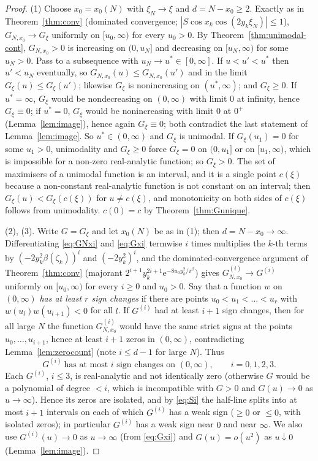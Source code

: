 \documentclass[11pt,a4paper]{article}
\theoremstyle{definition}
\theoremstyle{remark}
\newcommand{\ee}{\mathrm{e}}
\begin{document}
\begin{proof}
(1) Choose $x_0=x_0(N)$ with $\xi_N\to\xi$ and $d=N-x_0\ge2$. Exactly as in Theorem~\ref{thm:conv} (dominated
convergence; $|S\cos x_k\cos(2y_k\xi_N)|\le1$), $G_{N,x_0}\to G_\xi$ uniformly on $[u_0,\infty)$ for every $u_0>0$.
By Theorem~\ref{thm:unimodal-cont}, $G_{N,x_0}>0$ is increasing on $(0,u_N]$ and decreasing on $[u_N,\infty)$ for
some $u_N>0$. Pass to a subsequence with $u_N\to u^*\in[0,\infty]$. If $u<u'<u^*$ then $u'<u_N$ eventually, so
$G_{N,x_0}(u)\le G_{N,x_0}(u')$ and in the limit $G_\xi(u)\le G_\xi(u')$; likewise $G_\xi$ is nonincreasing on
$(u^*,\infty)$; and $G_\xi\ge0$. If $u^*=\infty$, $G_\xi$ would be nondecreasing on $(0,\infty)$ with limit $0$ at
infinity, hence $G_\xi\equiv0$; if $u^*=0$, $G_\xi$ would be nonincreasing with limit $0$ at $0^+$
(Lemma~\ref{lem:image}), hence again $G_\xi\equiv0$; both contradict the last statement of
Lemma~\ref{lem:image}. So $u^*\in(0,\infty)$ and $G_\xi$ is unimodal.
If $G_\xi(u_1)=0$ for some $u_1>0$, unimodality and $G_\xi\ge0$ force $G_\xi=0$ on $(0,u_1]$ or on $[u_1,\infty)$,
which is impossible for a non-zero real-analytic function; so $G_\xi>0$. The set of maximisers of a unimodal
function is an interval, and it is a single point $c(\xi)$ because a non-constant real-analytic function is not
constant on an interval; then $G_\xi(u)<G_\xi(c(\xi))$ for $u\ne c(\xi)$, and monotonicity on both sides of
$c(\xi)$ follows from unimodality. $c(0)=c$ by Theorem~\ref{thm:Gunique}.

(2), (3). Write $G=G_\xi$ and let $x_0(N)$ be as in (1); then $d=N-x_0\to\infty$. Differentiating \eqref{eq:GNxi} and
\eqref{eq:Gxi} termwise $i$ times multiplies the $k$-th terms by $(-2y_k^2\beta(\zeta_k))^i$ and $(-2y_k^2)^i$, and the
dominated-convergence argument of Theorem~\ref{thm:conv} (majorant $2^{i+1}y_k^{2i+1}\ee^{-8u_0y_k^2/\pi^2}$) gives
$G_{N,x_0}^{(i)}\to G^{(i)}$ uniformly on $[u_0,\infty)$ for every $i\ge0$ and $u_0>0$. Say that a function $w$ on
$(0,\infty)$ \emph{has at least $r$ sign changes} if there are points $u_0<u_1<\dots<u_r$ with
$w(u_{l})w(u_{l+1})<0$ for all $l$. If $G^{(i)}$ had at least $i+1$ sign changes, then for all large $N$ the function
$G_{N,x_0}^{(i)}$ would have the same strict signs at the points $u_0,\dots,u_{i+1}$, hence at least $i+1$ zeros in
$(0,\infty)$, contradicting Lemma~\ref{lem:zerocount} (note $i\le d-1$ for large $N$). Thus
\begin{equation}\label{eq:Si}
  G^{(i)}\ \text{has at most $i$ sign changes on }(0,\infty),\qquad i=0,1,2,3 .
\end{equation}
Each $G^{(i)}$, $i\le3$, is real-analytic and not identically zero (otherwise $G$ would be a polynomial of degree
$<i$, which is incompatible with $G>0$ and $G(u)\to0$ as $u\to\infty$). Hence its zeros are isolated, and by
\eqref{eq:Si} the half-line splits into at most $i+1$ intervals on each of which $G^{(i)}$ has a weak sign ($\ge0$ or
$\le0$, with isolated zeros); in particular $G^{(i)}$ has a weak sign near $0$ and near $\infty$. We also use
$G^{(i)}(u)\to0$ as $u\to\infty$ (from \eqref{eq:Gxi}) and $G(u)=o(u^2)$ as $u\downarrow0$ (Lemma~\ref{lem:image}).


\end{proof}
\end{document}
